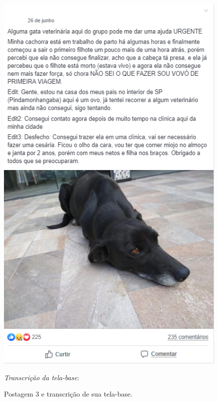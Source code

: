 \documentclass{textolivre-html}
\begin{document}
\begin{figure}[htbp]
 \begin{minipage}{.45\textwidth}
 \centering
 \includegraphics[width=\textwidth]{fig05.png}
 \caption{Postagem 3 e transcrição de sua tela-base.}
 \label{fig05}
 \end{minipage}\hfill
 \begin{minipage}{0.5\textwidth}
 \textit{Transcrição da tela-base}:\\
 

\end{minipage}
\end{figure}
\end{document}
